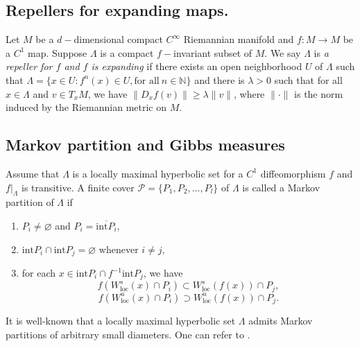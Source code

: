 \documentclass[11pt,a4paper]{amsart}
\theoremstyle{plain}
\theoremstyle{remark}
\begin{document}
	\subsection{Repellers for expanding maps.} Let $M$ be a $d-$dimensional compact $C^{\infty}$ Riemannian manifold  and $f:M\rightarrow M$ be a $C^{1}$ map. Suppose $\Lambda$ is a compact $f-$invariant subset of $M$. We say $\Lambda$ is {\it a repeller for $f$ and $f$ is expanding} if there exists an open neighborhood $U$ of $\Lambda$ such that $\Lambda=\{x\in U: f^{n}(x)\in U, \text{for~all}~n\in\mathbb{N}\}$ and there is $\lambda>0$ such that for all $x\in \Lambda$ and $v\in T_{x}M$, we have $\|D_{x}f (v)\|\geq \lambda \|v\|$, where $\|\cdot\|$ is the norm induced by the Riemannian metric on $M$.

	\iffalse
	\subsection{Markov partition and Gibbs measures}
	Assume that $\Lambda$ is a locally maximal hyperbolic set for a $C^{1}$ diffeomorphism $f$ and $f|_{\Lambda}$ is transitive. A finite cover $\mathcal{P}=\{P_{1},P_{2},...,P_{l}\}$ of $\Lambda$ is called a Markov partition of $\Lambda$ if
	\begin{enumerate}
		\item $P_{i}\neq \varnothing$ and $P_{i}=\overline{\text{int} P_{i}}$,
		\item $\text{int} P_{i} \cap \text{int} P_{j} =\varnothing$ whenever $i\neq j$,
		\item for each $x\in \text{int} P_{i}\cap f^{-1} \text{int} P_{j}$, we have
		$$f(W^{s}_{\text{loc}}(x)\cap P_{i})\subset W^{s}_{\text{loc}}(f(x))\cap P_{j},$$
		$$f(W^{u}_{\text{loc}}(x)\cap P_{i})\supset W^{u}_{\text{loc}}(f(x))\cap P_{j}.$$
	\end{enumerate}
	It is well-known that a locally maximal hyperbolic set $\Lambda$ admits Markov partitions of arbitrary small diameters. One can refer to \cite{KH}.
	
\end{document}
